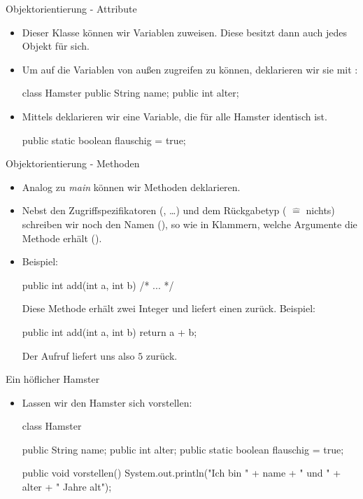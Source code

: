 \begin{frame}[t,fragile]{Objektorientierung - Attribute}
    \begin{itemize}[<+(1)->]
        \item Dieser Klasse können wir Variablen zuweisen. \pause{} Diese besitzt dann auch jedes Objekt für sich.
        \item Um auf die Variablen von außen zugreifen zu können, deklarieren wir sie mit :\pause{}
\begin{java}[morekeywords={[2]{Hamster}}]
class Hamster {
    public String name;
    public int alter;
}
\end{java}
        \item Mittels  deklarieren wir eine Variable, die für alle Hamster identisch ist.\pause{}  \pause{}
        \begin{java*}
public static boolean flauschig = true;
        \end{java*}
    \end{itemize}
\end{frame}

\begin{frame}[t,fragile]{Objektorientierung - Methoden}
    \begin{itemize}[<+(1)->]
        \item Analog zu \emph{main} können wir Methoden deklarieren.
        \item Nebst den Zugriffspezifikatoren (, \ldots)\pause{} und dem Rückgabetyp ( $\widehat{=}$ nichts)\pause{} schreiben wir noch den Namen (),\pause{} so wie in Klammern, welche Argumente die Methode erhält ().
        \item Beispiel:\pause{}
\begin{java*}
public int add(int a, int b){ /* ... */ }
\end{java*}
        Diese Methode erhält zwei Integer und liefert einen zurück. Beispiel:\pause{}
\begin{java*}
public int add(int a, int b){
    return a + b;
}
\end{java*}
        \pause{}Der Aufruf  liefert uns also $5$ zurück.
    \end{itemize}
\end{frame}

\begin{frame}[t,fragile]{Ein höflicher Hamster}
    \begin{itemize}[<+(1)->]
        \item Lassen wir den Hamster sich vorstellen:\pause{}
\begin{java}[morekeywords={[2]{Hamster}},morekeywords={[6]{vorstellen}}]
class Hamster {
    public String name;
    public int alter;
    public static boolean flauschig = true;

    public void vorstellen(){
        System.out.println("Ich bin " + name + " und " + alter + " Jahre alt");
    }
}
\end{java}
    \end{itemize}
\end{frame}

